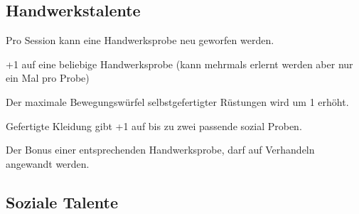 \documentclass[../../Heldenanleitung2]{subfiles}
\begin{document}
\subsection{Handwerkstalente}
\begin{multicols}{2}
\begin{tcolorbox}[title={Handwerker},colbacktitle=orange, coltitle=black]    
   Pro Session kann eine Handwerksprobe neu geworfen werden.
\end{tcolorbox}

\begin{tcolorbox}[title={Handwerksfokus},colbacktitle=orange, coltitle=black]    
   +1 auf eine beliebige Handwerksprobe (kann mehrmals erlernt werden aber nur ein Mal pro Probe)
\end{tcolorbox}



\begin{tcolorbox}[title={Passgenau},colbacktitle=orange, coltitle=black]    
   Der maximale Bewegungswürfel selbstgefertigter Rüstungen wird um 1 erhöht.
\end{tcolorbox}

\begin{tcolorbox}[title={Schönes Handwerk},colbacktitle=orange, coltitle=black]    
   Gefertigte Kleidung gibt +1 auf bis zu zwei passende sozial Proben.
\end{tcolorbox}

\begin{tcolorbox}[title={Fachwissen},colbacktitle=orange, coltitle=black]    
   Der Bonus einer entsprechenden Handwerksprobe, darf auf Verhandeln angewandt werden.
\end{tcolorbox}

\end{multicols}

\subsection{Soziale Talente}
\end{document}
